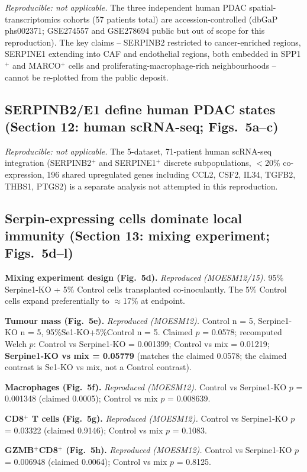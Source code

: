 \documentclass[preprint,12pt]{elsarticle}
\begin{document}
\emph{Reproducible: not applicable.} The three independent human
PDAC spatial-transcriptomics cohorts (57 patients total) are
accession-controlled (dbGaP phs002371; GSE274557 and GSE278694 public
but out of scope for this reproduction). The key claims --
SERPINB2 restricted to cancer-enriched regions, SERPINE1 extending
into CAF and endothelial regions, both embedded in
SPP1$^{+}$ and MARCO$^{+}$ cells and proliferating-macrophage-rich
neighbourhoods -- cannot be re-plotted from the public deposit.

\subsection{SERPINB2/E1 define human PDAC states
(Section 12: human scRNA-seq; Figs.~5a--c)}

\emph{Reproducible: not applicable.} The 5-dataset, 71-patient
human scRNA-seq integration (SERPINB2$^{+}$ and SERPINE1$^{+}$
discrete subpopulations, $<$20\% co-expression, 196 shared
upregulated genes including CCL2, CSF2, IL34, TGFB2, THBS1, PTGS2)
is a separate analysis not attempted in this reproduction.

\subsection{Serpin-expressing cells dominate local immunity
(Section 13: mixing experiment; Figs.~5d--l)}

\textbf{Mixing experiment design (Fig.~5d).} \emph{Reproduced
(MOESM12/15).} 95\% Serpine1-KO + 5\% Control cells transplanted
co-inoculantly. The 5\% Control cells expand preferentially to
$\approx$17\% at endpoint.

\textbf{Tumour mass (Fig.~5e).} \emph{Reproduced (MOESM12).}
Control n = 5, Serpine1-KO n = 5, 95\%Se1-KO+5\%Control n = 5.
Claimed $p$ = 0.0578; recomputed Welch $p$: Control vs
Serpine1-KO = 0.001399; Control vs mix = 0.01219;
\textbf{Serpine1-KO vs mix = 0.05779} (matches the claimed 0.0578;
the claimed contrast is Se1-KO vs mix, not a Control contrast).

\textbf{Macrophages (Fig.~5f).} \emph{Reproduced (MOESM12).}
Control vs Serpine1-KO $p$ = 0.001348 (claimed 0.0005);
Control vs mix $p$ = 0.008639.

\textbf{CD8$^{+}$ T cells (Fig.~5g).} \emph{Reproduced
(MOESM12).} Control vs Serpine1-KO $p$ = 0.03322 (claimed 0.9146);
Control vs mix $p$ = 0.1083.

\textbf{GZMB$^{+}$CD8$^{+}$ (Fig.~5h).} \emph{Reproduced
(MOESM12).} Control vs Serpine1-KO $p$ = 0.006948 (claimed
0.0064); Control vs mix $p$ = 0.8125.
\end{document}
